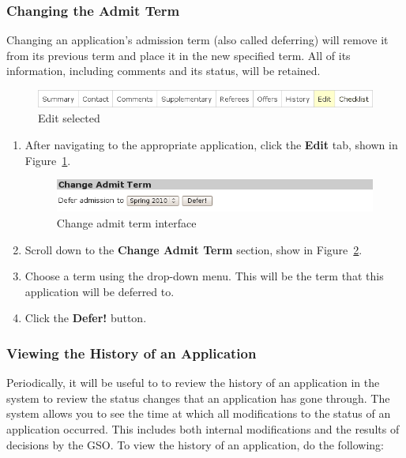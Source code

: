 \documentclass[titlepage]{article}
\begin{document}
\subsubsection{Changing the Admit Term}

Changing an application's admission term (also called deferring) will remove it
from its previous term and place it in the new specified term. All of its
information, including comments and its status, will be retained.

\begin{figure}[h!]
  \begin{center}
  \includegraphics[width=13cm]{apptabs_edit.png}
  \end{center}
  \caption{Edit selected}
  \label{yEdit}
\end{figure}

\begin{enumerate}
\item After navigating to the appropriate application, click the
  \textbf{\textsf{Edit}} tab, shown in Figure~\ref{yEdit}.

\begin{figure}[h!]
  \begin{center}
  \includegraphics[width=13cm]{defer.png}
  \end{center}
  \caption{Change admit term interface}
  \label{yDefer}
\end{figure}

\item Scroll down to the \textbf{\textsf{Change Admit Term}} section, show in
  Figure~\ref{yDefer}.
\item Choose a term using the drop-down menu. This will be the term that this
  application will be deferred to.
\item Click the \textbf{\textsf{Defer!}} button.
\end{enumerate}


\subsubsection{Viewing the History of an Application}

Periodically, it will be useful to to review the history of an application in the system to review the status changes that an application has gone through.  The system allows you to see the time at which all modifications to the status of an application occurred. This includes both internal modifications and the results of decisions by the GSO. To view the history of an application, do the following:
\end{document}
